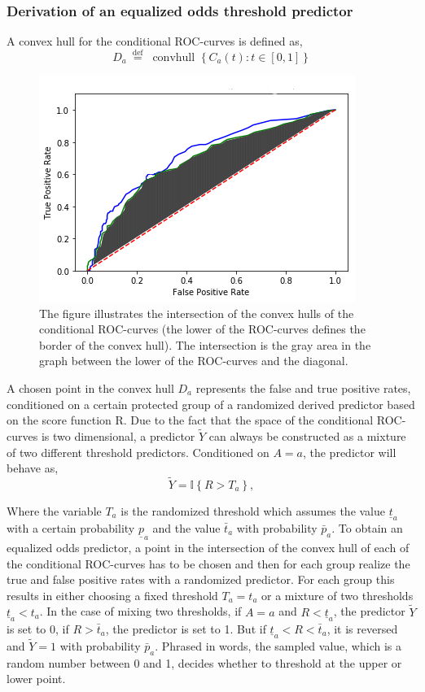 \documentclass[11pt, fleqn, titlepage]{article}
\begin{document}
	\subsubsection{Derivation of an equalized odds threshold predictor} \label{optimalboi}
	A convex hull for the conditional ROC-curves is defined as, 
	\begin{equation*}\label{key}
	D_{a} \stackrel{\text { def }}{=} \text { convhull }\left\{C_{a}(t): t \in[0,1]\right\}
	\end{equation*}

	\begin{figure}[H]
		\centering
		\includegraphics[width=0.5\linewidth]{imgs/convex_hull}
		\caption{The figure illustrates the intersection of the convex hulls of the conditional ROC-curves (the lower of the ROC-curves defines the border of the convex hull). The intersection is the gray area in the graph between the lower of the ROC-curves and the diagonal.}
		\label{fig:convexhull}
	\end{figure}
	\noindent
	A chosen point in the convex hull $ D_a $ represents the false and true positive rates, conditioned on a certain protected group of a randomized derived predictor based on the score function R. Due to the fact that the space of the conditional ROC-curves is two dimensional, a predictor $ \tilde Y $ can always be constructed as a mixture of two different threshold predictors. Conditioned on $ A=a $, the predictor will behave as, 
	\begin{equation}\label{odds_pred}
	\widetilde{Y}=\mathbb{I}\left\{R>T_{a}\right\},
	\end{equation}
	
	\noindent Where the variable $ T_a $ is the randomized threshold which assumes the value $ \underline{t}_{a} $ with a certain probability $ \underline{p}_a $ and the value $\bar t_{a} $ with probability $ \bar p_a $. To obtain an equalized odds predictor, a point in the intersection of the convex hull of each of the conditional ROC-curves has to be chosen and then for each group realize the true and false positive rates with a randomized predictor. For each group this results in either choosing a fixed threshold $ T_a = t_a $ or a mixture of two thresholds $ \underline t_a < t_a $. In the case of mixing two thresholds, if $ A=a $ and $ R < \underline t_a $, the predictor $ \tilde Y $ is set to 0, if $ R > \bar t_a $, the predictor is set to 1. But if $ \underline t_a < R < \bar t_a $, it is reversed and $ \tilde Y = 1 $ with probability $ \bar p_a$. Phrased in words, the sampled value, which is a random number between 0 and 1, decides whether to threshold at the upper or lower point.
	
\end{document}
